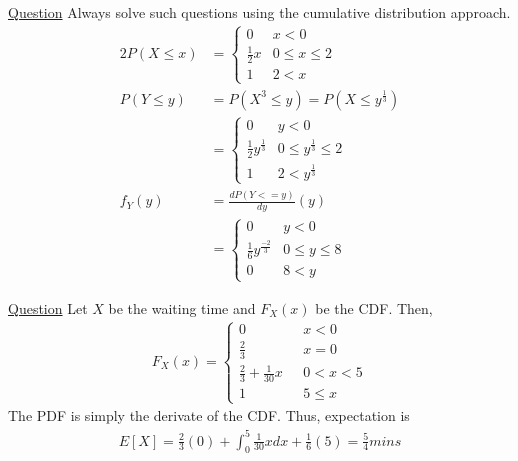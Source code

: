 \documentclass[11pt, a4paper]{article}
\begin{document}
\begin{enumerate}
        \hypertarget{a_pmffn}{\item} \hyperlink{q_pmffn}{Question}\newline
        Always solve such questions using the cumulative distribution approach.
        \begin{alignat*}{2}
            P(X \leq x) &= \begin{cases} 0 &\mbox{$x < 0$}\\
                                        \frac{1}{2} x &\mbox{$0 \leq x \leq 2$}\\
                                        1 &\mbox{$2 < x$} \end{cases}\\
            P(Y \leq y) &= P(X^{3} \leq y) = P(X \leq y^{\frac{1}{3}})\\
                        &= \begin{cases}  0 &\mbox{$y < 0$}\\
                                            \frac{1}{2} y^{\frac{1}{3}} &\mbox{$0 \leq y^{\frac{1}{3}} \leq 2$}\\
                                            1 &\mbox{$2 < y^{\frac{1}{3}}$} \end{cases}\\
            f_{Y}(y) &= \frac{dP(Y <= y)}{dy}(y)\\
                     &= \begin{cases}  0 &\mbox{$y < 0$}\\
                                            \frac{1}{6} y^{\frac{-2}{3}} &\mbox{$0 \leq y \leq 8$}\\
                                            0 &\mbox{$8 < y$} \end{cases}
        \end{alignat*}

        \hypertarget{a_waittaxi}{\item} \hyperlink{q_waittaxi}{Question}\newline
        Let $X$ be the waiting time and $F_{X}(x)$ be the CDF. Then,
        \begin{align*}
            F_{X}(x) = \begin{cases} 0 &\mbox{ $x < 0$}\\
                                    \frac{2}{3} &\mbox{ $x = 0$}\\
                                    \frac{2}{3} + \frac{1}{30}x &\mbox{ $0 < x < 5$}\\
                                    1 &\mbox{ $5 \leq x$} \end{cases}
        \end{align*}
        The PDF is simply the derivate of the CDF. Thus, expectation is
        \begin{align*}
            E[X] = \frac{2}{3}(0) + \int_{0}^{5} \frac{1}{30}x dx + \frac{1}{6}(5) = \frac{5}{4} mins
        \end{align*}


\end{enumerate}
\end{document}
